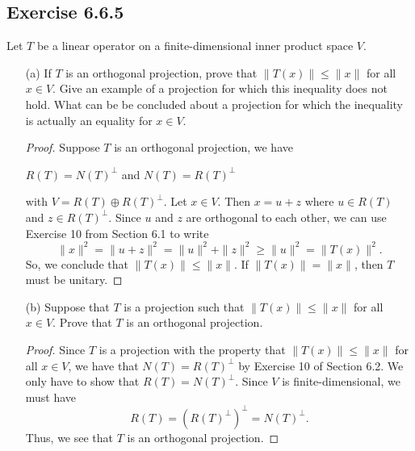 \subsection*{Exercise 6.6.5} Let \( T  \) be a linear operator on a finite-dimensional inner product space \( V  \).
\begin{enumerate}
    \item[(a)] If \( T  \) is an orthogonal projection, prove that \( \|T(x)\| \leq \|x\| \) for all \( x \in V  \). Give an example of a projection for which this inequality does not hold. What can be be concluded about a projection for which the inequality is actually an equality for \( x \in V  \).
        \begin{proof}
        Suppose \( T  \) is an orthogonal projection, we have
        \begin{center}
            \( R(T) = N(T)^{\perp} \) and \( N(T) = R(T)^{\perp} \)
        \end{center}
        with \( V = R(T) \oplus R(T)^{\perp} \). Let \( x \in V  \). Then \( x = u + z  \) where \( u \in R(T) \) and \( z \in R(T)^{\perp} \). Since \( u  \) and \( z  \) are orthogonal to each other, we can use Exercise 10 from Section 6.1 to write
        \[  \|x\|^{2} = \| u   + z \|^{2} = \|u\|^{2} + \|z\|^{2} \geq \|u\|^{2} =  \|T(x)\|^{2}. \]
        So, we conclude that \( \|T(x)\| \leq \|x\|  \). If \( \|T(x)\| = \|x\|  \), then \( T  \) must be unitary.
        \end{proof}
    \item[(b)] Suppose that \( T  \) is a projection such that \( \|T(x)\| \leq \|x\| \) for all \( x \in V  \). Prove that \( T  \) is an orthogonal projection.
        \begin{proof}
        Since \( T \) is a projection with the property that \( \|T(x)\| \leq \|x \| \) for all \( x \in V  \), we have that \( N(T) = R(T)^{\perp} \) by Exercise 10 of Section 6.2. We only have to show that \( R(T) = N(T)^{\perp} \). Since \( V  \) is finite-dimensional, we must have
        \[  R(T) = (R(T)^{\perp})^{\perp} = N(T)^{\perp}.   \]
        Thus, we see that \( T  \) is an orthogonal projection.
        \end{proof}
\end{enumerate}

